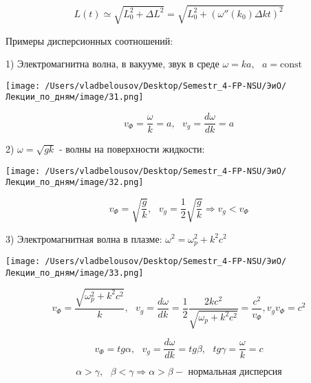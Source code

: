 \documentclass[12pt, a4paper]{report}
\begin{document}
\[ L(t  ) \simeq \sqrt{L_0 ^2 + \Delta L  ^2 } = \sqrt{ L_0 ^2 + ( \omega '' (k_0  )\Delta k t) ^2 }   \] 

Примеры дисперсионных соотношений: 

1) Электромагнитна волна, в вакууме, звук в среде \( \omega = k a , \text{ }  a = \mathrm{const}   \) 

\begin{center}
    \texttt{[image: /Users/vladbelousov/Desktop/Semestr\_4-FP-NSU/ЭиО/Лекции\_по\_дням/image/31.png]}
\end{center}

\[ v_{\Phi  } = \frac{\omega}{ k }  = a, \text{ }  v_g = \frac{ d \omega }{ d k}= a    \] 

2) \( \omega = \sqrt{gk } \) - волны на поверхности жидкости: 

\begin{center}
    \texttt{[image: /Users/vladbelousov/Desktop/Semestr\_4-FP-NSU/ЭиО/Лекции\_по\_дням/image/32.png]}
\end{center}

\[ v_{\Phi } = \sqrt{\frac{g}{k} }, \text{ }  v_g = \frac{1}{ 2} \sqrt{\frac{g}{k} } \Rightarrow v_g< v_{\Phi}     \] 

3) Электромагнитная волна в плазме: \( \omega ^2 = \omega_p ^2 + k ^2 c ^2  \) 

\begin{center}
    \texttt{[image: /Users/vladbelousov/Desktop/Semestr\_4-FP-NSU/ЭиО/Лекции\_по\_дням/image/33.png]}
\end{center}

\[ v_{\Phi }  = \frac{\sqrt{ \omega_p ^2 + k ^2  c ^2 }}{k }, \text{ }  v_g = \frac{d \omega }{dk } =\frac{1}{2 }  \frac{2 k c ^2 }{\sqrt{ \omega_p + k ^2 c ^2 }} = \frac{ c ^2 }{v_{\Phi} } , v_g v_{\Phi }  = c ^2   \] 

\[ v_{\Phi } = tg \alpha, \text{ }  v_g = \frac{d \omega } {dk } = tg \beta , \text{ }  tg \gamma = \frac{\omega}{k }  = c   \] 

\[ \alpha > \gamma , \text{ }  \beta < \gamma \Rightarrow \alpha  > \beta - \text{ нормальная дисперсия}    \] 





\ifdefined\mainfile
\else
    
\end{document}
